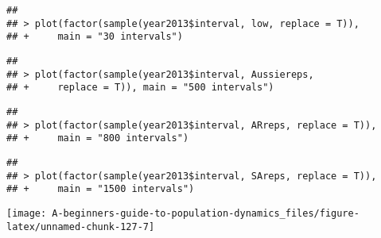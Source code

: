 \documentclass[]{book}
\begin{document}
\begin{verbatim}
## 
## > plot(factor(sample(year2013$interval, low, replace = T)), 
## +     main = "30 intervals")
\end{verbatim}

\begin{verbatim}
## 
## > plot(factor(sample(year2013$interval, Aussiereps, 
## +     replace = T)), main = "500 intervals")
\end{verbatim}

\begin{verbatim}
## 
## > plot(factor(sample(year2013$interval, ARreps, replace = T)), 
## +     main = "800 intervals")
\end{verbatim}

\begin{verbatim}
## 
## > plot(factor(sample(year2013$interval, SAreps, replace = T)), 
## +     main = "1500 intervals")
\end{verbatim}

\begin{center}\texttt{[image: A-beginners-guide-to-population-dynamics\_files/figure-latex/unnamed-chunk-127-7]} \end{center}
\end{document}
